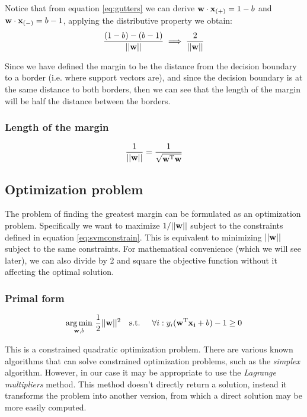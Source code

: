 Notice that from equation \ref{eq:gutters} we can derive $\mathbf{w} \cdot \mathbf{x}_{(+)} = 1 - b$ and $\mathbf{w} \cdot \mathbf{x}_{(-)} = b - 1$, applying the distributive property we obtain:
\begin{align*}
    \frac{(1 - b) - (b - 1)}{||\mathbf{w}||} \implies \frac{2}{||\mathbf{w}||}
\end{align*}

Since we have defined the margin to be the distance from the decision boundary to a border (i.e. where support vectors are), and since the decision boundary is at the same distance to both borders, then we can see that the length of the margin will be half the distance between the borders.

\subsubsection*{Length of the margin}

\begin{align}
    \frac{1}{||\mathbf{w}||} = \frac{1}{\sqrt{\mathbf{w}^{\text{T}} \mathbf{w}}}
\end{align}

\subsection{Optimization problem}

The problem of finding the greatest margin can be formulated as an optimization problem. Specifically we want to maximize $1/||\mathbf{w}||$ subject to the constraints defined in equation \ref{eq:svmconstrain}. This is equivalent to minimizing $||\mathbf{w}||$ subject to the same constraints. For mathematical convenience (which we will see later), we can also divide by 2 and square the objective function without it affecting the optimal solution.

\subsubsection*{Primal form}
\begin{align}\label{eq:svm_primal} 
    \underset{\mathbf{w}, b}{\text{arg} \min}\ \frac{1}{2} ||\mathbf{w}||^2 \text{\quad s.t. \quad} \forall i : y_i (\mathbf{w}^{\text{T}} \mathbf{x_i} + b) - 1 \ge 0
\end{align}

This is a constrained quadratic optimization problem. There are various known algorithms that can solve constrained optimization problems, such as the \emph{simplex} algorithm. However, in our case it may be appropriate to use the \emph{Lagrange multipliers} method. This method doesn't directly return a solution, instead it transforms the problem into another version, from which a direct solution may be more easily computed.

